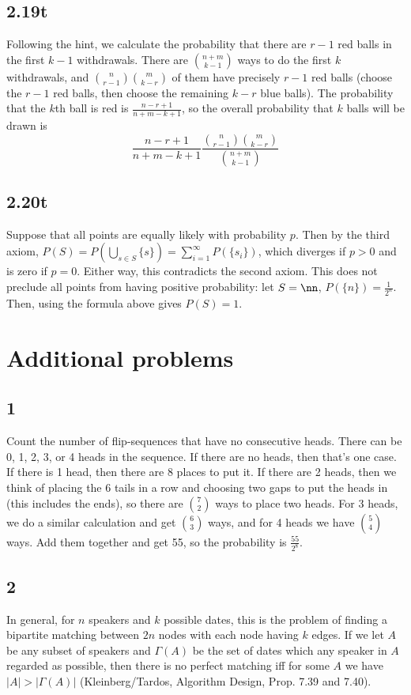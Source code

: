\documentclass{article}
\begin{document}
\subsection*{2.19t}
Following the hint, we calculate the probability that there are $r-1$ red balls in the first $k-1$ withdrawals. There are $\binom{n+m}{k-1}$ ways to do the first $k$ withdrawals, and $\binom{n}{r-1}\binom{m}{k-r}$ of them have precisely $r-1$ red balls (choose the $r-1$ red balls, then choose the remaining $k-r$ blue balls). The probability that the $k$th ball is red is $\frac{n-r+1}{n+m-k+1}$, so the overall probability that $k$ balls will be drawn is 
$$\frac{n-r+1}{n+m-k+1}\frac{\binom{n}{r-1}\binom{m}{k-r}}{\binom{n+m}{k-1}}$$
\subsection*{2.20t}
Suppose that all points are equally likely with probability $p$. Then by the third axiom, $P(S)=P(\bigcup_{s\in S}\{s\})=\sum_{i=1}^\infty P(\{s_i\})$, which diverges if $p>0$ and is zero if $p=0$. Either way, this contradicts the second axiom. This does not preclude all points from having positive probability: let $S=\nn$, $P(\{n\})=\frac{1}{2^n}$. Then, using the formula above gives $P(S)=1$.

\section*{Additional problems}
\subsection*{1}
Count the number of flip-sequences that have no consecutive heads. There can be 0, 1, 2, 3, or 4 heads in the sequence. If there are no heads, then that's one case. If there is 1 head, then there are 8 places to put it. If there are 2 heads, then we think of placing the 6 tails in a row and choosing two gaps to put the heads in (this includes the ends), so there are $\binom{7}{2}$ ways to place two heads. For 3 heads, we do a similar calculation and get $\binom{6}{3}$ ways, and for 4 heads we have $\binom{5}{4}$ ways. Add them together and get 55, so the probability is $\frac{55}{2^8}$.
\subsection*{2}
In general, for $n$ speakers and $k$ possible dates, this is the problem of finding a bipartite matching between $2n$ nodes with each node having $k$ edges. If we let $A$ be any subset of speakers and $\Gamma(A)$ be the set of dates which any speaker in $A$ regarded as possible, then there is no perfect matching iff for some $A$ we have $|A|>|\Gamma(A)|$ (Kleinberg/Tardos, Algorithm Design, Prop. 7.39 and 7.40). 
\end{document}
